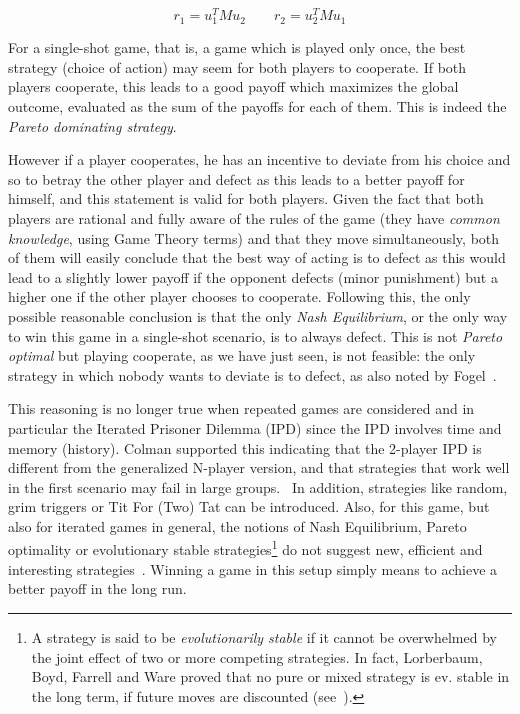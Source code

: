 \documentclass[journal,a4paper,10pt,twoside]{IEEEtran} %
\begin{document}
$$
r_1 = u_1^T M u_2
\quad
\quad
r_2 = u_2^T M u_1
$$

For a single-shot game, that is, a game which is played only once, the best strategy (choice of action) may seem for both players to cooperate. If both players cooperate, this leads to a good payoff which maximizes the global outcome, evaluated as the sum of the payoffs for each of them. This is indeed the \textit{Pareto dominating strategy}.

However if a player cooperates, he has an incentive to deviate from his choice and so to betray the other player and defect as this leads to a better payoff for himself, and this statement is valid for both players. 
Given the fact that both players are rational and fully aware of the rules of the game (they have \textit{common knowledge}, using Game Theory terms) and that they move simultaneously, both of them will easily conclude that the best way of acting is to defect as this would lead to a slightly lower payoff if the opponent defects (minor punishment) but a higher one if the other player chooses to cooperate.
Following this, the only possible reasonable conclusion is that the only \textit{Nash Equilibrium}, or the only way to win this game in a single-shot scenario, is to always defect.
This is not \textit{Pareto optimal} but playing cooperate, as we have just seen, is not feasible: the only strategy in which nobody wants to deviate is to defect, as also noted by Fogel~\cite{fogelEvolvingBehaviors}.

This reasoning is no longer true when repeated games are considered and in particular the Iterated Prisoner Dilemma (IPD) since the IPD involves time and memory (history).
Colman supported this indicating that the 2-player IPD is different from the generalized N-player version, and that strategies that work well in the first scenario may fail in large groups.~\cite{yao1994experimental}
In addition, strategies like random, grim triggers or Tit For (Two) Tat can be introduced.
Also, for this game, but also for iterated games in general, the notions of Nash Equilibrium, Pareto optimality or evolutionary stable strategies\footnote{A strategy is said to be \textit{evolutionarily stable} if it cannot be overwhelmed by the joint effect of two or more competing strategies. In fact, Lorberbaum, Boyd, Farrell and Ware proved that no pure or mixed strategy is ev. stable in the long term, if future moves are discounted (see~\cite{lorb94}).} do not suggest new, efficient and interesting strategies~\cite{mathieu2017}.
Winning a game in this setup simply means to achieve a better payoff in the long run.
\end{document}
